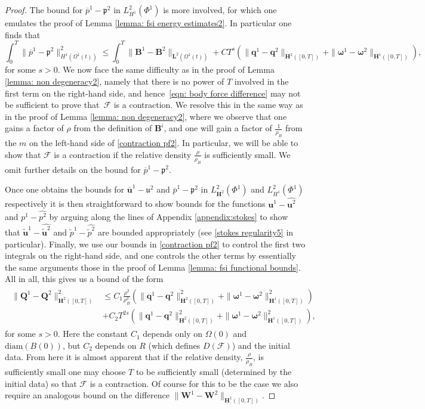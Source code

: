 \documentclass[a4paper]{amsart}
\numberwithin{equation}{section}
\theoremstyle{plain}
\newcommand{\mbf}[1]{\mathbf{#1}}
\newcommand{\utwo}{\boldsymbol{\mathfrak{u}}^2}
\newcommand{\ptwo}{\boldsymbol{\mathfrak{p}}^2}
\begin{document}
\begin{proof}
The bound for $\overline{p}^1 - \ptwo$ in $L^2_{H^1}(\Phi^1)$ is more involved, for which one emulates the proof of Lemma \ref{lemma: fsi energy estimates2}.
In particular one finds that
\[ \int_0^T \| \overline{p}^1 - \ptwo \|_{H^1(\Omega^1(t))}^2 \leq \int_0^T \|\mbf{B}^1 - \widehat{\mbf{B}^2}\|_{\mbf{L}^2(\Omega^1(t))} + C T^s \left( \|\mbf{q}^1-\mbf{q}^2\|_{\mbf{H}^2([0,T])} + \|\boldsymbol{\omega}^1-\boldsymbol{\omega}^2\|_{\mbf{H}^1([0,T])} \right),  \]
for some $s > 0$.
We now face the same difficulty as in the proof of Lemma \ref{lemma: non degeneracy2}, namely that there is no power of $T$ involved in the first term on the right-hand side, and hence~\eqref{eqn: body force difference} may not be sufficient to prove that~$\mathscr{F}$ is a contraction.
We resolve this in the same way as in the proof of Lemma \ref{lemma: non degeneracy2}, where we observe that one gains a factor of $\rho$ from the definition of $\mbf{B}^i$, and one will gain a factor of $\frac{1}{\rho_B}$ from the $m$ on the left-hand side of \eqref{contraction pf2}.
In particular, we will be able to show that $\mathscr{F}$ is a contraction if the relative density $\frac{\rho}{\rho_B}$ is sufficiently small.
We omit further details on the bound for $\overline{p}^1 - \ptwo$.

Once one obtains the bounds for $\overline{\mbf{u}}^1 - \utwo$ and $ \overline{p}^1 - \ptwo$ in $L^2_{\mbf{H}^2}(\Phi^1)$ and $L^2_{H^1}(\Phi^1)$ respectively it is then straightforward to show bounds for the functions ${\mbf{u}}^1 - \widehat{\mbf{u}^2}$ and ${p}^1 - \widehat{p^2}$ by arguing along the lines of Appendix \ref{appendix:stokes} to show that $\widetilde{\mbf{u}}^1 - \widehat{\widetilde{\mbf{u}}^2}$ and $\widetilde{p}^1 - \widehat{\widetilde{p}^2}$ are bounded appropriately (see \eqref{stokes regularity5} in particular).
Finally, we use our bounds in \eqref{contraction pf2} to control the first two integrals on the right-hand side, and one controls the other terms by essentially the same arguments those in the proof of Lemma \ref{lemma: fsi functional bounds}.
All in all, this gives us a bound of the form
\begin{align}
\begin{aligned}
    \|\mbf{Q}^1 - \mbf{Q}^2\|_{\mbf{H}^2([0,T])}^2 &\leq C_1\frac{\rho^2}{\rho_B^2} \left( \|\mbf{q}^1-\mbf{q}^2\|_{\mbf{H}^2([0,T])}^2 + \|\boldsymbol{\omega}^1-\boldsymbol{\omega}^2\|_{\mbf{H}^1([0,T])}^2 \right)\\
    &+ C_2T^{2s} \left( \|\mbf{q}^1-\mbf{q}^2\|_{\mbf{H}^2([0,T])}^2 + \|\boldsymbol{\omega}^1-\boldsymbol{\omega}^2\|_{\mbf{H}^1([0,T])}^2 \right),
    \end{aligned}
    \label{contraction pf8}
\end{align}
for some $s > 0$.
Here the constant $C_1$ depends only on $\Omega(0)$ and $\mathrm{diam}(B(0))$, but $C_2$ depends on $R$ (which defines $D(\mathscr{F})$) and the initial data.
From here it is almost apparent that if the relative density, $\frac{\rho}{\rho_B}$, is sufficiently small one may choose $T$ to be sufficiently small (determined by the initial data) so that $\mathscr{F}$ is a contraction.
Of course for this to be the case we also require an analogous bound on the difference $\|\mbf{W}^1 - \mbf{W}^2\|_{\mbf{H}^1([0,T])}$.


\end{proof}
\end{document}
